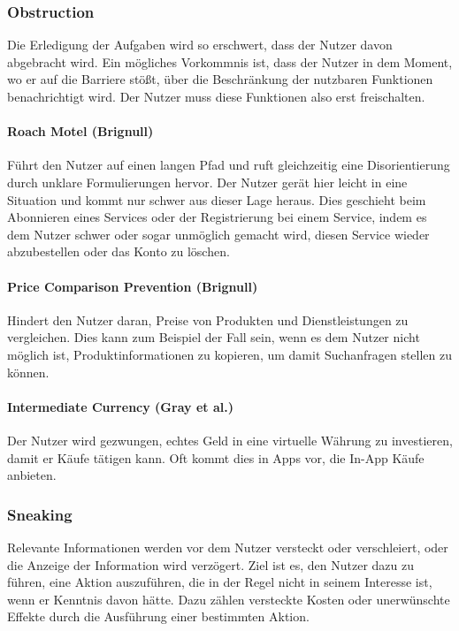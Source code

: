 \documentclass[a4paper]{article}
\begin{document}
\subsubsection{Obstruction} 
Die Erledigung der Aufgaben wird so erschwert, dass der Nutzer davon abgebracht wird. Ein mögliches Vorkommnis ist, dass der Nutzer in dem Moment, wo er auf die Barriere stößt, über die Beschränkung der nutzbaren Funktionen benachrichtigt wird. Der Nutzer muss diese Funktionen also erst freischalten.	

\paragraph{Roach Motel (Brignull)} 
Führt den Nutzer auf einen langen Pfad und ruft gleichzeitig eine Disorientierung durch unklare Formulierungen hervor. Der Nutzer gerät hier leicht in eine Situation und kommt nur schwer aus dieser Lage heraus. Dies geschieht beim Abonnieren eines Services oder der Registrierung bei einem Service, indem es dem Nutzer schwer oder sogar unmöglich gemacht wird, diesen Service wieder abzubestellen oder das Konto zu löschen.

\paragraph{Price Comparison Prevention (Brignull)} 
Hindert den Nutzer daran, Preise von Produkten und Dienstleistungen zu vergleichen. Dies kann zum Beispiel der Fall sein, wenn es dem Nutzer nicht möglich ist, Produktinformationen zu kopieren, um damit Suchanfragen stellen zu können.

\paragraph{Intermediate Currency (Gray et al.)} 
Der Nutzer wird gezwungen, echtes Geld in eine virtuelle Währung zu investieren, damit er Käufe tätigen kann. Oft kommt dies in Apps vor, die In-App Käufe anbieten.

\subsubsection{Sneaking}
Relevante Informationen werden vor dem Nutzer versteckt oder verschleiert, oder die Anzeige der Information wird verzögert. Ziel ist es, den Nutzer dazu zu führen, eine Aktion auszuführen, die in der Regel nicht in seinem Interesse ist, wenn er Kenntnis davon hätte. Dazu zählen versteckte Kosten oder unerwünschte Effekte durch die Ausführung einer bestimmten Aktion.
\end{document}
